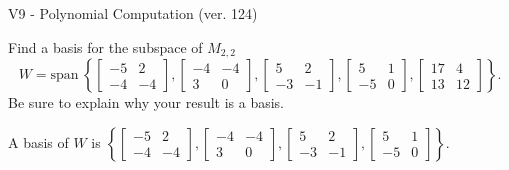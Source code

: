\begin{exercise}
  \begin{exerciseTitle}V9 - Polynomial Computation (ver. 124)\end{exerciseTitle}
  \begin{exerciseStatement}
    Find a basis for the subspace of \(M_{2,2}\) 
\[W=\mathrm{span}\ \left\{\left[\begin{array}{cc}
-5 & 2 \\
-4 & -4
\end{array}\right] , \left[\begin{array}{cc}
-4 & -4 \\
3 & 0
\end{array}\right] , \left[\begin{array}{cc}
5 & 2 \\
-3 & -1
\end{array}\right] , \left[\begin{array}{cc}
5 & 1 \\
-5 & 0
\end{array}\right] , \left[\begin{array}{cc}
17 & 4 \\
13 & 12
\end{array}\right]\right\}.\]
 Be sure to explain why your result is a basis.


  \end{exerciseStatement}
  \begin{exerciseAnswer}
   A basis of \(W\) is  \(\left\{\left[\begin{array}{cc}
-5 & 2 \\
-4 & -4
\end{array}\right] , \left[\begin{array}{cc}
-4 & -4 \\
3 & 0
\end{array}\right] , \left[\begin{array}{cc}
5 & 2 \\
-3 & -1
\end{array}\right] , \left[\begin{array}{cc}
5 & 1 \\
-5 & 0
\end{array}\right]\right\}\).
  


  \end{exerciseAnswer}
\end{exercise}